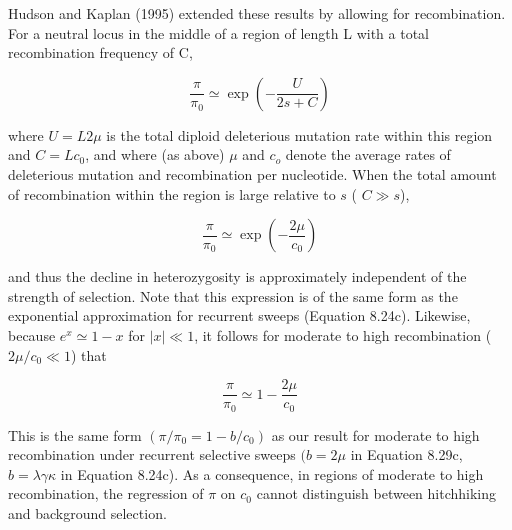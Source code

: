 \documentclass{article}
\begin{document}
Hudson and Kaplan (1995) extended these results by allowing for recombination. For a neutral locus in the middle of a region of length L with a total recombination frequency of C,

\begin{equation}
\frac{\pi}{\pi_{0}}\simeq\exp\left(-\frac{U}{2s+C}\right)
\tag{8.29a}
\label{eq:8_29a}
\end{equation}

where  $ U = L2\mu $ is the total diploid deleterious mutation rate within this region and  $ C = Lc_0 $, and where (as above)  $ \mu $ and  $ c_o $ denote the average rates of deleterious mutation and recombination per nucleotide. When the total amount of recombination within the region is large relative to  $ s $ ( $ C \gg s $),

\begin{equation}
\frac{\pi}{\pi_{0}}\simeq\exp\left(-\frac{2\mu}{c_{0}}\right)
\tag{8.29b}
\label{eq:8_29b}
\end{equation}

and thus the decline in heterozygosity is approximately independent of the strength of selection. Note that this expression is of the same form as the exponential approximation for recurrent sweeps (Equation 8.24c). Likewise, because  $ e^x \simeq 1 - x $ for  $ |x| \ll 1 $, it follows for moderate to high recombination ( $ 2\mu/c_0 \ll 1 $) that

\begin{equation}
\frac{\pi}{\pi_{0}}\simeq1-\frac{2\mu}{c_{0}}
\tag{8.29c}
\label{eq:8_29c}
\end{equation}

This is the same form  $ (\pi/\pi_0 = 1 - b/c_0) $ as our result for moderate to high recombination under recurrent selective sweeps  $ (b = 2\mu $ in Equation 8.29c,  $ b = \lambda\gamma\kappa $ in Equation 8.24c). As a consequence, in regions of moderate to high recombination, the regression of  $ \pi $ on  $ c_0 $ cannot distinguish between hitchhiking and background selection.
\end{document}
